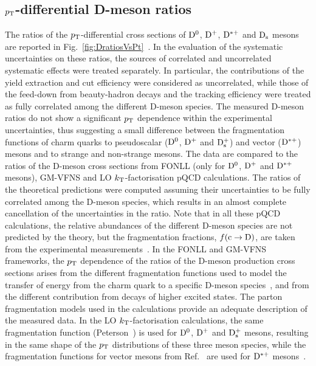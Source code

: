 \subsection{$p_{\rm T}$-differential D-meson ratios}
\label{sec:ppDratios}
The ratios of the $p_{\rm T}$-differential cross sections of ${\rm D^0}$, ${\rm D^+}$, 
${\rm D^{*+}}$ and ${\rm D_s}$ mesons are reported in Fig.~\ref{fig:DratiosVsPt}~\cite{Acharya:2017jgo}.
In the evaluation of the systematic uncertainties on these ratios, 
the sources of correlated and uncorrelated systematic effects were treated 
separately. In particular, the contributions of the yield extraction and cut efficiency 
were considered as uncorrelated, while those of the feed-down from 
beauty-hadron decays and the tracking efficiency were treated as fully 
correlated among the different D-meson species.
The measured D-meson ratios do not show a significant $p_{\rm T}$ dependence within 
the experimental uncertainties, thus suggesting a small difference 
between the fragmentation functions of charm quarks to pseudoscalar 
(${\rm D^0}$, ${\rm D^+}$ and ${\rm D_s^+}$) and vector (${\rm D^{*+}}$) mesons and to strange and 
non-strange mesons.
The data are compared to the ratios of the D-meson cross sections from FONLL 
(only for ${\rm D^0}$, ${\rm D^+}$ and ${\rm D^{*+}}$ mesons), GM-VFNS and LO 
$k_{\rm T}$-factorisation pQCD calculations.
The ratios of the theoretical predictions were computed assuming their 
uncertainties to be fully correlated among the D-meson species, which 
results in an almost complete cancellation of the uncertainties in the ratio. 
Note that in all these pQCD calculations, the relative abundances of the 
different D-meson species are not predicted by the theory, but 
the fragmentation fractions, $f({\rm c\rightarrow D})$, are taken from 
the experimental measurements~\cite{Kneesch:2007ey,Cacciari:2012ny,Cacciari:2003zu,Maciula:2013wg,Barate:1999bg,Gladilin:2014tba}.
In the FONLL and GM-VFNS frameworks, the $p_{\rm T}$ dependence 
of the ratios of the D-meson production cross sections arises from the 
different fragmentation functions used to model the transfer of energy from 
the charm quark to a specific D-meson 
species~\cite{Cacciari:2003zu,Kneesch:2007ey,Kniehl:2006mw}, 
and from the different contribution from decays of higher excited states.
The parton fragmentation models used in the calculations provide
an adequate description of the measured data.
In the LO $k_{\rm T}$-factorisation calculations, the same fragmentation function 
(Peterson~\cite{Peterson:1982ak}) is used for ${\rm D^0}$, ${\rm D^+}$ and ${\rm D_s^+}$ 
mesons, resulting in the same shape of the $p_{\rm T}$ distributions of these three 
meson species, while 
the fragmentation functions for vector mesons from Ref.~\cite{Braaten:1994bz} 
are used for ${\rm D^{*+}}$ mesons~\cite{Maciula:2013wg}.


